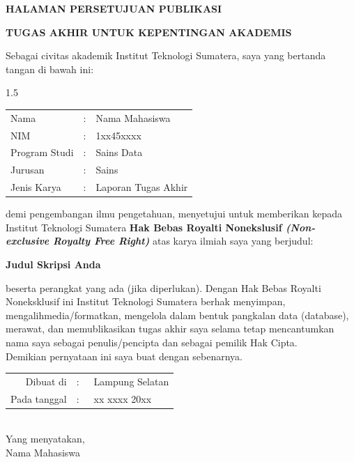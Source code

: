 \cleardoublepage
\centerline{\large\bfseries HALAMAN PERSETUJUAN PUBLIKASI}
\vspace*{1ex}
\centerline{\large\bfseries TUGAS AKHIR UNTUK KEPENTINGAN AKADEMIS}
{}
\vspace*{40pt}
Sebagai civitas akademik Institut Teknologi Sumatera, saya yang bertanda tangan di bawah ini:
\begin{spacing}{1.5}
	\begin{tabular}{lcl}
		Nama 			&:& Nama Mahasiswa \\
		NIM 			&:& 1xx45xxxx  \\
		Program Studi 	&:& Sains Data  \\
		Jurusan 		&:& Sains \\
		Jenis Karya 	&:& Laporan Tugas Akhir
	\end{tabular}
\end{spacing}
demi pengembangan ilmu pengetahuan, menyetujui untuk memberikan kepada Institut Teknologi Sumatera \textbf{Hak Bebas Royalti Nonekslusif \textit{(Non-exclusive Royalty Free Right)}} atas karya ilmiah saya yang berjudul:
\begin{center} \textbf{Judul Skripsi Anda}\end{center}
beserta perangkat yang ada (jika diperlukan). Dengan Hak Bebas Royalti Noneksklusif ini Institut Teknologi Sumatera berhak menyimpan, mengalihmedia/formatkan, mengelola dalam bentuk pangkalan data (database), merawat, dan memublikasikan tugas akhir saya selama tetap mencantumkan nama saya sebagai penulis/pencipta dan sebagai pemilik Hak Cipta.\\
Demikian pernyataan ini saya buat dengan sebenarnya.
\begin{center}
\begin{tabular}{rcl}
	Dibuat di 		&:&~Lampung Selatan\\
	Pada tanggal 	&:&~xx xxxx 20xx \\
\end{tabular}
\\[2ex]
Yang menyatakan,\\[10ex]
Nama Mahasiswa
\end{center}
